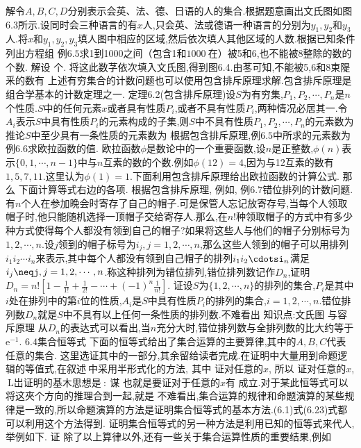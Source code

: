 {解令$A,B,C,D$分别表示会英、法、德、日语的人的集合.根据题意画出文氏图如图$6.3$所示.设同时会三种语言的有$x$人,只会英、法或德语一种语言的分别为$y_{1},y_{2}$和$y_{3}$人.将$x$和$y_{1},y_{2},y_{3}$填人图中相应的区域,然后依次填人其他区域的人数.根据已知条件列出方程组
例$6.5$求1到1000之间（包含1和$1000\mathrm{~在）}$被5和6,也不能被8整除的数的个数.
{解设}
个.
将这此数芓依次填入文氏图,得到图6.4.由苳可知,不能被5,6和8束隄釆的数有
上述有穷集合的计数问题也可以使用包含排斥原理求解.包含排斥原理是组合学基本的计数定理之一.
定理6.2(包含排斥原理)设$S$为有穷集,$P_{1},P_{2},\cdots,P_{n}$是$n$个性质.$S$中的任何元素$x$或者具有性质$P_{i}$,或者不具有性质$P_{i}$,两种情况必居其一.令$A_{i}$表示$S$中具有性质$P_{i}$的元素构成的子集,则$S$中不具有性质$P_{1},P_{2},\cdots,P_{n}$的元素数为
推论$S$中至少具有一条性质的元素数为
根据包含排斥原理,例$6.5$中所求的元素数为
例$6.6$求欧拉函数的值.
欧拉函数$\phi$是数论中的一个重要函数,设$n$是正整数,$\phi(n)$表示$\{0,1,\cdots,n-1\}$中与$n$互素的数的个数.例如$\phi(12)=4$,因为与12互素的数有$1,5,7,11$.这里认为$\phi(1)=1$.下面利用包含排斥原理给出欧拉函数的计算公式.
那么
下面计算等式右边的各项.
根据包含排斥原理,
例如,
例$6.7$错位排列的计数问题.有$n$个人在参加晩会时寄存了自己的帽子.可是保管人忘记放寄存号,当每个人领取帽子时,他只能随机选择一顶帽子交给寄存人.那么,在$n$!种领取帽子的方式中有多少种方式使得每个人都没有领到自己的帽子?如果将这些人与他们的帽子分别标号为$1,2,\cdots,n$.设$j$领到的帽子标号为$i_{j},j=1,2,\cdots,n$,那么这些人领到的帽子可以用排列$i_{1}i_{2}\cdots$$i_{n}$来表示,其中每个人都没有领到自己帽子的排列$i_{1}i_{2}\cdotsi_{n}$满足$i_{j}\neqj,j=1,2,\cdots,n$.称这种排列为错位排列,错位排列数记作$D_{n}$,证明$D_{n}=n!\left[1-\frac{1}{1!}+\frac{1}{2!}-\cdots+(-1)^{n}\frac{1}{n!}\right]$.
证设$S$为$\{1,2,\cdots,n\}$的排列的集合,$P_{i}$是其中$i$处在排列中的第$i$位的性质,$A_{i}$是$S$中具有性质$P_{i}$的排列的集合,$i=1,2,\cdots,n$.错位排列数$D_{n}$就是$S$中不具有以上任何一条性质的排列数.不难看出
知识点:文氏图
与容斥原理
从$D_{n}$的表达式可以看出,当$n$充分大时,错位排列数与全排列数的比大约等于$\mathrm{e}^{-1}$.
{$6.4$集合恒等式}
下面的恒等式给出了集合运算的主要算律,其中的$A,B,C$代表任意的集合.
这里选证其中的一部分,其余留给读者完成.在证明中大量用到命题逻辑的等值式,在叙述$\mathrm{~中采用半形式化的方法,~其中}$
证对任意的$x$,
所以
证对任意的$x$,
$\mathrm{~L岀证明的基木思想是~:~谋}$
也就是要证对于任意的$x$有
成立.对于某此恒等式可以将这夾个方向的推理合到一起,就是
不难看出,集合运算的规律和命题演算的某些规律是一致的,所以命题演算的方法是证明集合恒等式的基本方法.(6.1)式(6.23)式都可以利用这个方法得到.
证明集合恒等式的另一种方法是利用已知的恒等式来代人,举例如下.
证
除了以上算律以外,还有一些关于集合运算性质的重要结果,例如
$$}
